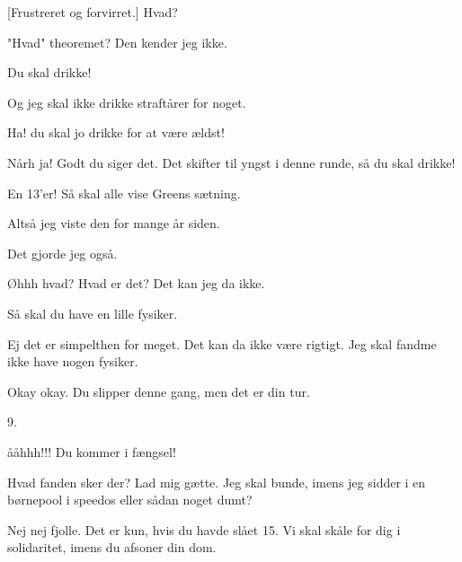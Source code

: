 \documentclass[a4paper,11pt]{article}
\begin{document}
\begin{sketch}
[Frustreret og forvirret.] Hvad? 

 "Hvad" theoremet? Den kender jeg ikke.

 Du skal drikke!


 Og jeg skal ikke drikke straftårer for noget.

 Ha! du skal jo drikke for at være ældst!

 Nårh ja! Godt du siger det. Det skifter til yngst i denne runde, så du skal drikke!



 En 13'er! Så skal alle vise Greens sætning.


 Altså jeg viste den for mange år siden.

 Det gjorde jeg også.


 Øhhh hvad? Hvad er det? Det kan jeg da ikke.

 Så skal du have en lille fysiker. 


 Ej det er simpelthen for meget. Det kan da ikke være rigtigt. Jeg skal fandme ikke have nogen fysiker. 


 Okay okay. Du slipper denne gang, men det er din tur. 


 9. 


 ååhhh!!! Du kommer i fængsel!


 Hvad fanden sker der? Lad mig gætte. Jeg skal bunde, imens jeg sidder i en børnepool i speedos eller sådan noget dumt? 

 Nej nej fjolle. Det er kun, hvis du havde slået 15. Vi skal skåle for dig i solidaritet, imens du afsoner din dom. 


\end{sketch}
\end{document}
